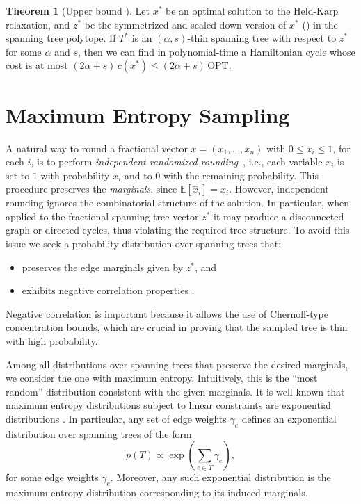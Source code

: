 \documentclass[12pt]{report}
\renewcommand{\eqref}[1]{\textup{(\textcolor{eqred}{\getrefnumber{#1}})}}
\theoremstyle{definition}
\newtheorem{theorem}{Theorem}
\begin{document}
\begin{theorem}[Upper bound \cite{asadpour}]
Let $x^*$ be an optimal solution to the Held-Karp relaxation, and $z^*$ be the symmetrized and scaled down version of $x^*$ \eqref{symmetrize} in the spanning tree polytope. If $T^*$ is an $(\alpha,s)$-thin spanning tree with respect to $z^*$ for some $\alpha$ and $s$, then we can find in polynomial-time a Hamiltonian cycle whose cost is at most
\(
(2\alpha + s)\, c(x^*) \le (2\alpha + s)\, \mathrm{OPT}.
\)
\end{theorem}

\section{Maximum Entropy Sampling}
A natural way to round a fractional vector $x = (x_1,\dots,x_n)$ with $0 \le x_i \le 1$, for each $i$, is to perform \emph{independent randomized rounding}~\cite{independent_rounding}, i.e., each variable $x_i$ is set to $1$ with probability $x_i$ and to $0$ with the remaining probability. This procedure preserves the \emph{marginals}, since $\mathbb{E}[\hat x_i] = x_i$. However, independent rounding ignores the combinatorial structure of the solution. In particular, when applied to the fractional spanning-tree vector $z^*$ it may produce a disconnected graph or directed cycles, thus violating the required tree structure. To avoid this issue we seek a probability distribution over spanning trees that:
\begin{itemize}
\item preserves the edge marginals given by $z^*$, and
\item exhibits negative correlation properties \cite{negative_correlation}.
\end{itemize}
Negative correlation is important because it allows the use of Chernoff-type concentration bounds, which are crucial in proving that the sampled tree is thin with high probability.

Among all distributions over spanning trees that preserve the desired marginals, we consider the one with maximum entropy. Intuitively, this is the ``most random'' distribution consistent with the given marginals. It is well known that maximum entropy distributions subject to linear constraints are exponential distributions \cite{boyd2004convex}. In particular, any set of edge weights $\gamma_e$ defines an exponential distribution over spanning trees of the form
\[
p(T) \propto \exp\!\left(\sum_{e\in T} \gamma_e \right),
\]
for some edge weights $\gamma_e$. Moreover, any such exponential distribution is the maximum entropy distribution corresponding to its induced marginals.
\end{document}
